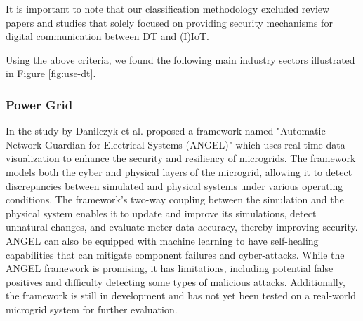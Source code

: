 It is important to note that our classification methodology excluded review papers and studies that solely focused on providing security mechanisms for digital communication between DT and (I)IoT. 



Using the above criteria, we found the following main industry sectors illustrated in Figure \ref{fig:use-dt}. \\

\begin{center}
 

\label{fig:use-dt}
\end{center}
\subsubsection*{Power Grid}
In the study by Danilczyk et al.\cite{williamdanilczykANGELIntelligentDigital2019} proposed a framework named "Automatic Network Guardian for Electrical Systems (ANGEL)" which uses real-time data visualization to enhance the security and resiliency of microgrids. The framework models both the cyber and physical layers of the microgrid, allowing it to detect discrepancies between simulated and physical systems under various operating conditions. The framework's two-way coupling between the simulation and the physical system enables it to update and improve its simulations, detect unnatural changes, and evaluate meter data accuracy, thereby improving security. ANGEL can also be equipped with machine learning to have self-healing capabilities that can mitigate component failures and cyber-attacks. While the ANGEL framework is promising, it has limitations, including potential false positives and difficulty detecting some types of malicious attacks. Additionally, the framework is still in development and has not yet been tested on a real-world microgrid system for further evaluation.

